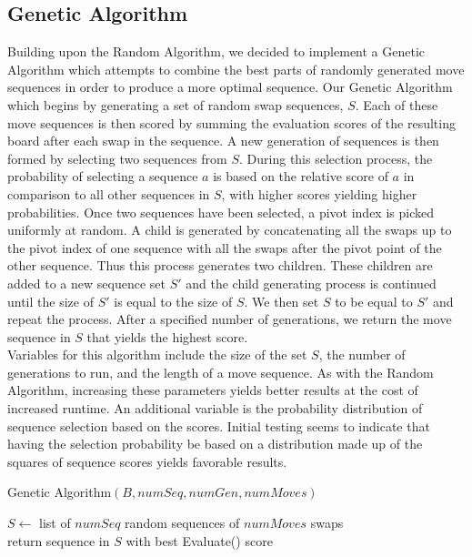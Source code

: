 \documentclass[10pt, final]{article}
\newcommand{\br}[1][.75]{\ \\[#1\baselineskip]}
\begin{document}
\subsection{Genetic Algorithm}
Building upon the Random Algorithm, we decided to implement a Genetic Algorithm which attempts to combine the best parts of randomly generated move sequences in order to produce a more optimal sequence. Our Genetic Algorithm which begins by generating a set of random swap sequences, $S$. Each of these move sequences is then scored by summing the evaluation scores of the resulting board after each swap in the sequence. A new generation of sequences is then formed by selecting two sequences from $S$. During this selection process, the probability of selecting a sequence $a$ is based on the relative score of $a$ in comparison to all other sequences in $S$, with higher scores yielding higher probabilities. Once two sequences have been selected, a pivot index is picked uniformly at random. A child is generated by concatenating all the swaps up to the pivot index of one sequence with all the swaps after the pivot point of the other sequence. Thus this process generates two children. These children are added to a new sequence set $S'$ and the child generating process is continued until the size of $S'$ is equal to the size of $S$. We then set $S$ to be equal to $S'$ and repeat the process. After a specified number of generations, we return the move sequence in $S$ that yields the highest score. \br
Variables for this algorithm include the size of the set $S$, the number of generations to run, and the length of a move sequence. As with the Random Algorithm, increasing these parameters yields better results at the cost of increased runtime. An additional variable is the probability distribution of sequence selection based on the scores. Initial testing seems to indicate that having the selection probability be based on a distribution made up of the squares of sequence scores yields favorable results.
\begin{algorithm}\label{genetic}\small
\caption{\small Genetic Algorithm$(B, numSeq, numGen, numMoves)$}
$S \gets$ list of $numSeq$ random sequences of $numMoves$ swaps\\
return sequence in $S$ with best Evaluate() score\\
\end{algorithm}
\end{document}
